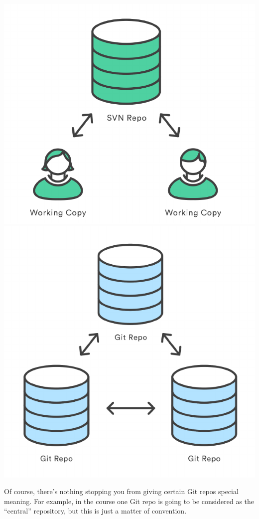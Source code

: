 \documentclass{article}
\begin{document}
\begin{center}
\includegraphics[scale=0.5]{figures/02.pdf}
\includegraphics[scale=0.5]{figures/03.pdf}
\end{center}

Of course, there's nothing stopping you from giving certain Git repos
special meaning. For example, in the course one Git repo is going to be
considered as the ``central'' repository, but this is just a matter of
convention.
\end{document}
